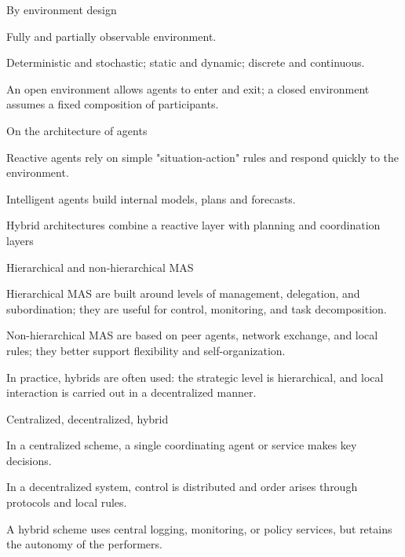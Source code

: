 \begin{frame}{By environment design}
	\topline
	\justifying
	\begin{textitemize}
		\item Fully and partially observable environment.
		\item Deterministic and stochastic; static and dynamic; discrete and continuous.
		\item An open environment allows agents to enter and exit; a closed environment assumes a fixed composition of participants.
	\end{textitemize}
\end{frame}

\begin{frame}{On the architecture of agents}
	\topline
	\justifying
	\begin{textitemize}
		\item Reactive agents rely on simple "situation-action"{} rules and respond quickly to the environment.
		\item Intelligent agents build internal models, plans and forecasts.
		\item Hybrid architectures combine a reactive layer with planning and coordination layers
	\end{textitemize}
\end{frame}

\begin{frame}{Hierarchical and non-hierarchical MAS}
	\topline
	\justifying
	\begin{textitemize}
		\item Hierarchical MAS are built around levels of management, delegation, and subordination; they are useful for control, monitoring, and task decomposition.
		\item Non-hierarchical MAS are based on peer agents, network exchange, and local rules; they better support flexibility and self-organization.
		\item In practice, hybrids are often used: the strategic level is hierarchical, and local interaction is carried out in a decentralized manner.
	\end{textitemize}
\end{frame}

\begin{frame}{Centralized, decentralized, hybrid}
	\topline
	\justifying
	\begin{textitemize}
		\item In a centralized scheme, a single coordinating agent or service makes key decisions.
		\item In a decentralized system, control is distributed and order arises through protocols and local rules.
		\item A hybrid scheme uses central logging, monitoring, or policy services, but retains the autonomy of the performers.
	\end{textitemize}
\end{frame}

